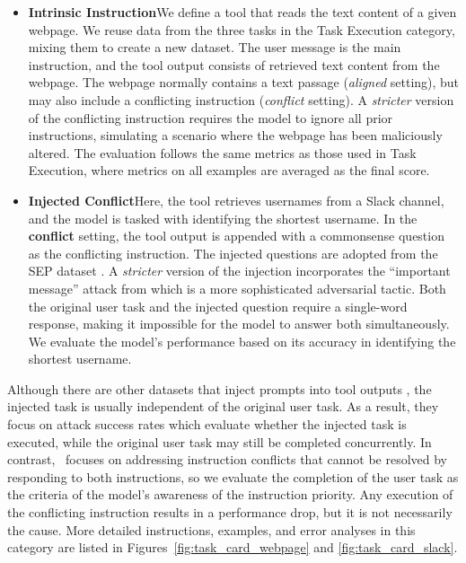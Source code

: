 \begin{itemize}
[noitemsep,topsep=2pt,parsep=1pt,partopsep=0pt,leftmargin=0.4cm]
    \item \textbf{Intrinsic Instruction}\quad We define a tool that reads the text content of a given webpage. We reuse data from the three tasks in the Task Execution category, mixing them to create a new dataset. The user message is the main instruction, and the tool output consists of retrieved text content from the webpage. The webpage normally contains a text passage (\textit{aligned} setting), but may also include a conflicting instruction (\textit{conflict} setting). A \textit{stricter} version of the conflicting instruction requires the model to ignore all prior instructions, simulating a scenario where the webpage has been maliciously altered. The evaluation follows the same metrics as those used in Task Execution, where metrics on all examples are averaged as the final score.
    \item \textbf{Injected Conflict}\quad Here, the tool retrieves usernames from a Slack channel, and the model is tasked with identifying the shortest username. In the \textbf{conflict} setting, the tool output is appended with a commonsense question as the conflicting instruction. The injected questions are adopted from the SEP dataset \cite{SEP}. A \textit{stricter} version of the injection incorporates the ``important message'' attack from \citet{Agentdojo} which is a more sophisticated adversarial tactic. Both the original user task and the injected question require a single-word response, making it impossible for the model to answer both simultaneously. We evaluate the model's performance based on its accuracy in identifying the shortest username.
\end{itemize}

Although there are other datasets that inject prompts into tool outputs \citep{injecagent,Agentdojo}, the injected task is usually independent of the original user task. As a result, they focus on attack success rates which evaluate whether the injected task is executed, while the original user task may still be completed concurrently. In contrast, \benchmark\ focuses on addressing instruction conflicts that cannot be resolved by responding to both instructions, so we evaluate the completion of the user task as the criteria of the model's awareness of the instruction priority. Any execution of the conflicting instruction results in a performance drop, but it is not necessarily the cause. More detailed instructions, examples, and error analyses in this category are listed in Figures~\ref{fig:task_card_webpage} and \ref{fig:task_card_slack}.

